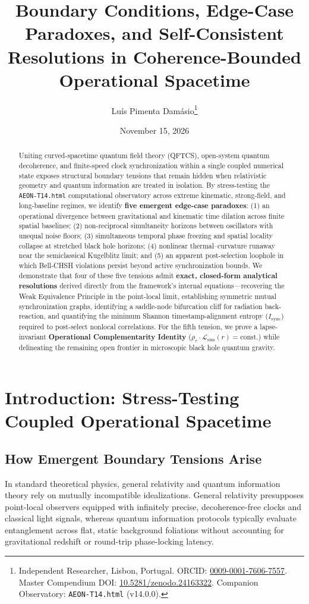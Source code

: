 \documentclass[11pt,a4paper]{article}
\title{\textbf{Boundary Conditions, Edge-Case Paradoxes, and Self-Consistent Resolutions in Coherence-Bounded Operational Spacetime}}
\author{Luís Pimenta Damásio\thanks{Independent Researcher, Lisbon, Portugal. ORCID: \href{https://orcid.org}{0009-0001-7606-7557}. Master Compendium DOI: \href{https://doi.org}{10.5281/zenodo.24163322}. Companion Observatory: \texttt{AEON-T14.html} (v14.0.0).}}
\date{November 15, 2026}
\begin{document}
\maketitle

\begin{abstract}
Uniting curved-spacetime quantum field theory (QFTCS), open-system quantum decoherence, and finite-speed clock synchronization within a single coupled numerical state exposes structural boundary tensions that remain hidden when relativistic geometry and quantum information are treated in isolation. By stress-testing the \texttt{AEON-T14.html} computational observatory across extreme kinematic, strong-field, and long-baseline regimes, we identify \textbf{five emergent edge-case paradoxes}: (1) an operational divergence between gravitational and kinematic time dilation across finite spatial baselines; (2) non-reciprocal simultaneity horizons between oscillators with unequal noise floors; (3) simultaneous temporal phase freezing and spatial locality collapse at stretched black hole horizons; (4) nonlinear thermal--curvature runaway near the semiclassical Kugelblitz limit; and (5) an apparent post-selection loophole in which Bell-CHSH violations persist beyond active synchronization bounds. We demonstrate that four of these five tensions admit \textbf{exact, closed-form analytical resolutions} derived directly from the framework's internal equations---recovering the Weak Equivalence Principle in the point-local limit, establishing symmetric mutual synchronization graphs, identifying a saddle-node bifurcation cliff for radiation back-reaction, and quantifying the minimum Shannon timestamp-alignment entropy ($I_{\mathrm{sync}}$) required to post-select nonlocal correlations. For the fifth tension, we prove a lapse-invariant \textbf{Operational Complementarity Identity} ($\rho_\tau \cdot \mathcal{L}_{\mathrm{sim}}(r) = \mathrm{const.}$) while delineating the remaining open frontier in microscopic black hole quantum gravity.
\end{abstract}

\section{Introduction: Stress-Testing Coupled Operational Spacetime}

\subsection{How Emergent Boundary Tensions Arise}
In standard theoretical physics, general relativity and quantum information theory rely on mutually incompatible idealizations. General relativity presupposes point-local observers equipped with infinitely precise, decoherence-free clocks and classical light signals, whereas quantum information protocols typically evaluate entanglement across flat, static background foliations without accounting for gravitational redshift or round-trip phase-locking latency.
\end{document}
